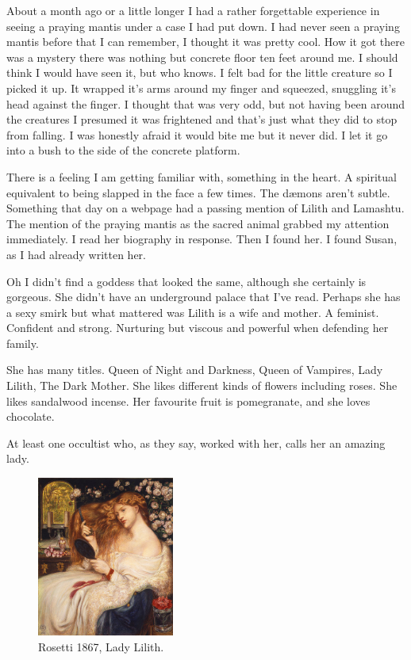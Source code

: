 \documentclass[12pt,twoside,onecolumn,openright,extrafontsizes]{memoir}
\begin{document}
{About a month ago or a little longer I had a rather forgettable experience in seeing a praying mantis under a case I had put down. I had never seen a praying mantis before that I can remember, I thought it was pretty cool. How it got there was a mystery there was nothing but concrete floor ten feet around me. I should think I would have seen it, but who knows. I felt bad for the little creature so I picked it up. It wrapped it's arms around my finger and squeezed, snuggling it's head against the finger. I thought that was very odd, but not having been around the creatures I presumed it was frightened and that's just what they did to stop from falling. I was honestly afraid it would bite me but it never did. I let it go into a bush to the side of the concrete platform.

There is a feeling I am getting familiar with, something in the heart. A spiritual equivalent to being slapped in the face a few times. The d\ae mons aren't subtle. Something that day on a webpage had a passing mention of Lilith and Lamashtu. The mention of the praying mantis as the sacred animal grabbed my attention immediately. I read her biography in response. Then I found her. I found Susan, as I had already written her.

Oh I didn't find a goddess that looked the same, although she certainly is gorgeous. She didn't have an underground palace that I've read. Perhaps she has a sexy smirk but what mattered was Lilith is a wife and mother. A feminist. Confident and strong. Nurturing but viscous and powerful when defending her family.
	
She has many titles. Queen of Night and Darkness, Queen of Vampires, Lady Lilith, The Dark Mother. She likes different kinds of flowers including roses. She likes sandalwood incense. Her favourite fruit is pomegranate, and she loves chocolate.

At least one occultist who, as they say, worked with her, calls her an amazing lady.


\begin{figure}
	\centering
	\includegraphics[width=0.40\textwidth]{Images/Rossetti_lady_lilith_1867}
	\\ {\small Rosetti 1867, Lady Lilith.}
\end{figure}


}
\end{document}
